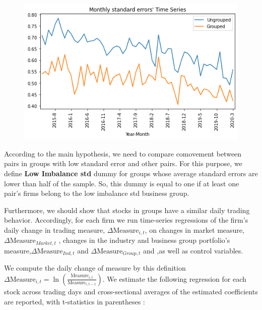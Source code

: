 \documentclass[12pt, a4paper]{article}
\begin{document}
\begin{table}[htbp]
	\centering
	\resizebox{0.75\textwidth}{!}{
		
	}
	\label{tab:ImbalanceSummary}%
\end{table}%
\begin{figure}[htbp]
	\centering
	\includegraphics[width=0.8\linewidth]{GroupedSTD}
	\label{fig:GroupedSTD}
\end{figure}

According to the main hypothesis, we need to compare comovement between pairs in groups with low standard error and other pairs.
For this purpose, we define \textbf{Low Imbalance std} dummy for groups whose average standard errors are lower than half of the sample. 
So, this dummy is equal to one if at least one pair's firms belong to the low imbalance std business group.
\begin{table}[htbp]
	\centering
	\resizebox{\textwidth}{!}{
		
	}
\end{table}
\FloatBarrier

Furthermore, we should show that stocks in groups have a similar daily trading behavior. Accordingly, for each firm we run time-series regressions of the firm's daily change in trading measure, $ \Delta \text{Measure}_{i,t} $, on changes in market measure,$ \Delta\text{Measure}_{Market,t}   $ , changes in the industry and business group portfolio's measure,$ \Delta\text{Measure}_{Ind,t} $ and  $\Delta \text{Measure}_{Group,t} $ and  ,as well as control variables.

We compute the daily change of measure by this definition $ \Delta \text{Measure}_{i,t} = \ln(\frac{\text{Measure}_{i,t}}{\text{Measure}_{i,t-1}}) $. 
We estimate the following regression for each stock across trading days and cross-sectional averages of the estimated coefficients are reported, with t-statistics in parentheses :
\end{document}
